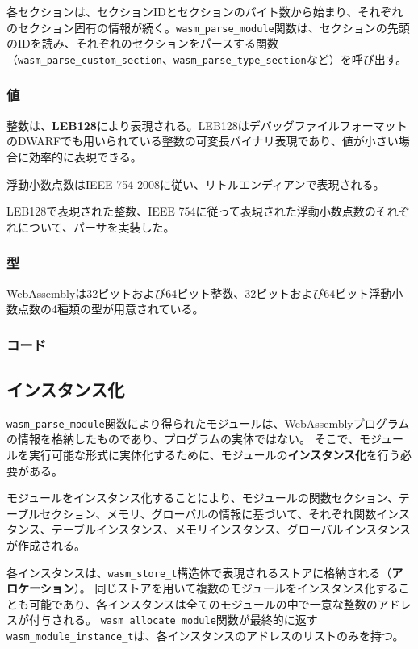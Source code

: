 各セクションは、セクションIDとセクションのバイト数から始まり、それぞれのセクション固有の情報が続く。\verb|wasm_parse_module|関数は、セクションの先頭のIDを読み、それぞれのセクションをパースする関数（\verb|wasm_parse_custom_section|、\verb|wasm_parse_type_section|など）を呼び出す。

\subsubsection{値}

整数は、{\bf LEB128}により表現される。LEB128はデバッグファイルフォーマットのDWARFでも用いられている\cite{dwarf}整数の可変長バイナリ表現であり、値が小さい場合に効率的に表現できる。

浮動小数点数はIEEE 754-2008\cite{ieee754}に従い、リトルエンディアンで表現される。

LEB128で表現された整数、IEEE 754に従って表現された浮動小数点数のそれぞれについて、パーサを実装した。

\subsubsection{型}

WebAssemblyは32ビットおよび64ビット整数、32ビットおよび64ビット浮動小数点数の4種類の型が用意されている。

\subsubsection{コード}

\subsection{インスタンス化}

\verb|wasm_parse_module|関数により得られたモジュールは、WebAssemblyプログラムの情報を格納したものであり、プログラムの実体ではない。
そこで、モジュールを実行可能な形式に実体化するために、モジュールの{\bf インスタンス化}を行う必要がある。

モジュールをインスタンス化することにより、モジュールの関数セクション、テーブルセクション、メモリ、グローバルの情報に基づいて、それぞれ関数インスタンス、テーブルインスタンス、メモリインスタンス、グローバルインスタンスが作成される。

各インスタンスは、\verb|wasm_store_t|構造体で表現されるストアに格納される（{\bf アロケーション}）。
同じストアを用いて複数のモジュールをインスタンス化することも可能であり、各インスタンスは全てのモジュールの中で一意な整数のアドレスが付与される。
\verb|wasm_allocate_module|関数が最終的に返す\verb|wasm_module_instance_t|は、各インスタンスのアドレスのリストのみを持つ。

